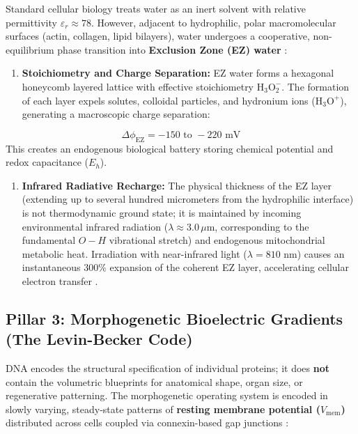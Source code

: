 \documentclass[10pt,twocolumn]{article}
\begin{document}
Standard cellular biology treats water as an inert solvent with relative permittivity $\varepsilon_r \approx 78$. However, adjacent to hydrophilic, polar macromolecular surfaces (actin, collagen, lipid bilayers), water undergoes a cooperative, non-equilibrium phase transition into \textbf{Exclusion Zone (EZ) water} \cite{Pollack2013}:
\begin{enumerate}
  \item \textbf{Stoichiometry and Charge Separation:} EZ water forms a hexagonal honeycomb layered lattice with effective stoichiometry $\text{H}_3\text{O}_2^-$. The formation of each layer expels solutes, colloidal particles, and hydronium ions ($\text{H}_3\text{O}^+$), generating a macroscopic charge separation:
\end{enumerate}
\begin{equation}
  \Delta \phi_{\text{EZ}} = -150\text{ to }-220\text{ mV}
\end{equation}
   This creates an endogenous biological battery storing chemical potential and redox capacitance ($E_h$).
\begin{enumerate}
  \item \textbf{Infrared Radiative Recharge:} The physical thickness of the EZ layer (extending up to several hundred micrometers from the hydrophilic interface) is not thermodynamic ground state; it is maintained by incoming environmental infrared radiation ($\lambda \approx 3.0\,\mu\text{m}$, corresponding to the fundamental $O-H$ vibrational stretch) and endogenous mitochondrial metabolic heat. Irradiation with near-infrared light ($\lambda = 810\text{ nm}$) causes an instantaneous $300\%$ expansion of the coherent EZ layer, accelerating cellular electron transfer \cite{Preparata1995, Sommer2008}.
\end{enumerate}


\subsection{Pillar 3: Morphogenetic Bioelectric Gradients (The Levin-Becker Code)}

DNA encodes the structural specification of individual proteins; it does \textbf{not} contain the volumetric blueprints for anatomical shape, organ size, or regenerative patterning. The morphogenetic operating system is encoded in slowly varying, steady-state patterns of \textbf{resting membrane potential ($V_{\text{mem}}$)} distributed across cells coupled via connexin-based gap junctions \cite{Becker1985, Levin2014, Levin2021}:
\end{document}
